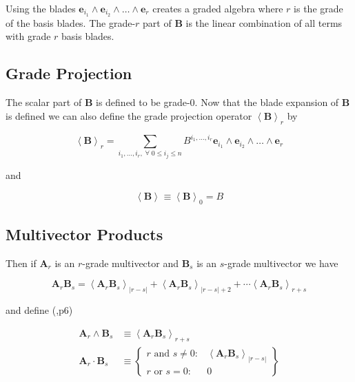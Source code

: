 \documentclass[12pt]{report}
\newcommand{\bm}[1]{\boldsymbol{#1}}
\newcommand{\llt}{\left <}
\newcommand{\rgt}{\right >}
\newcommand{\abs}[1]{\left |{#1}\right |}
\newcommand{\W}{\wedge}
\newcommand{\proj}[2]{\llt {#1} \rgt_{#2}}
\newcommand{\braces}[1]{\left \{ {#1} \right \}}
\newcommand{\eb}{\bm{e}}
\begin{document}
Using the blades $\eb_{i_{1}}\W \eb_{i_{2}}\W\dots\W \eb_{r}$ creates a graded
algebra where $r$ is the grade of the basis blades.  The grade-$r$
part of $\bm{B}$ is the linear combination of all terms with
grade $r$ basis blades.

\subsection{Grade Projection}

The scalar part of $\bm{B}$ is defined to
be grade-$0$.  Now that the blade expansion of $\bm{B}$ is defined
we can also define the grade projection operator $\proj{\bm{B}}{r}$ by

   \begin{equation}
      \proj{\bm{B}}{r} = \sum_{i_{1},\dots,i_{r},\;\forall\; 0\le i_{j} \le n} B^{i_{1},\dots,i_{r}}\eb_{i_{1}}\W \eb_{i_{2}}\W\dots\W \eb_{r}
   \end{equation}

and

   \begin{equation}
      \proj{\bm{B}}{} \equiv \proj{\bm{B}}{0} = B
   \end{equation}

\subsection{Multivector Products}

Then if $\bm{A}_{r}$ is an $r$-grade multivector and $\bm{B}_{s}$ is an $s$-grade multivector we have

   \begin{equation}
      \bm{A}_{r}\bm{B}_{s} = \proj{\bm{A}_{r}\bm{B}_{s}}{\abs{r-s}}+\proj{\bm{A}_{r}\bm{B}_{s}}{\abs{r-s}+2}+\cdots
                             \proj{\bm{A}_{r}\bm{B}_{s}}{r+s}
   \end{equation}

and define (\cite{Hestenes},p6)

   \begin{align}
      \bm{A}_{r}\W\bm{B}_{s} &\equiv \proj{\bm{A}_{r}\bm{B}_{s}}{r+s} \\
      \bm{A}_{r}\cdot\bm{B}_{s} &\equiv \braces{ \begin{array}{cc}
      r\mbox{ and }s \ne 0: & \proj{\bm{A}_{r}\bm{B}_{s}}{\abs{r-s}}  \\
      r\mbox{ or }s = 0: & 0 \end{array}}
   \end{align}
\end{document}
